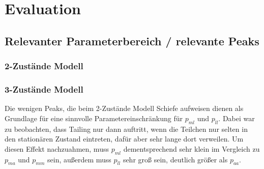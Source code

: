 
\chapter{Evaluation}
\label{chapter:eva}



\section{Relevanter Parameterbereich / relevante Peaks}


\subsection{2-Zustände Modell}


\subsection{3-Zustände Modell}

Die wenigen Peaks, die beim 2-Zustände Modell Schiefe aufweisen dienen als Grundlage für eine sinnvolle Parametereinschränkung für $p_{ml}$ und $p_{ll}$. Dabei war zu beobachten, dass Tailing nur dann auftritt, wenn die Teilchen nur selten in den stationären Zustand eintreten, dafür aber sehr lange dort verweilen. Um diesen Effekt nachzuahmen, muss $p_{ml}$ dementsprechend sehr klein im Vergleich zu $p_{ma}$ und $p_{mm}$ sein, außerdem muss $p_{ll}$ sehr groß sein, deutlich größer als $p_{aa}$.

